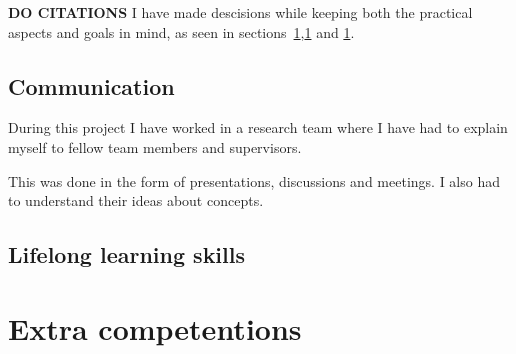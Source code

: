 \textbf{DO CITATIONS}
I have made descisions while keeping both the practical aspects and goals in mind, as seen in sections~\ref{},\ref{} and \ref{}.


\subsection{Communication}
During this project I have worked in a research team where I have had to explain myself to fellow team members and supervisors.

This was done in the form of presentations, discussions and meetings.
I also had to understand their ideas about concepts.


\subsection{Lifelong learning skills}


\section{Extra competentions}
